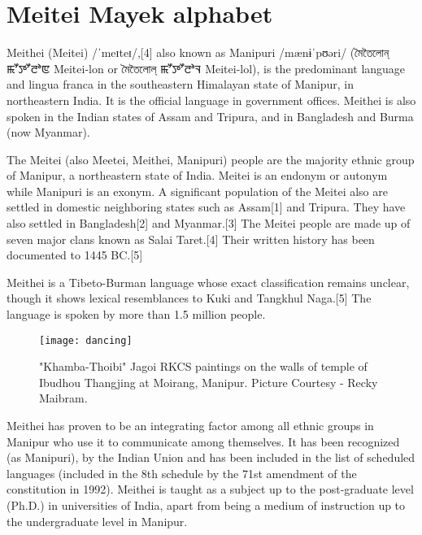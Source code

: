 \section{Meitei Mayek alphabet}
\label{s:meiteimayek}
\newfontfamily{}

\def\textmeitei#1{{\meitei #1}\xspace}

Meithei (Meitei) /ˈmeɪteɪ/,[4] also known as Manipuri /mænɨˈpʊəri/ ({\pan মৈতৈলোন্} \textmeitei{ꯃꯧꯇꯧꯂꯣꯟ} Meitei-lon or {\pan মৈতৈলোল্} \textmeitei{ꯃꯧꯇꯧꯂꯣꯜ} Meitei-lol), is the predominant language and lingua franca in the southeastern Himalayan state of Manipur, in northeastern India. It is the official language in government offices. Meithei is also spoken in the Indian states of Assam and Tripura, and in Bangladesh and Burma (now Myanmar).

The Meitei (also Meetei, Meithei, Manipuri) people are the majority ethnic group of Manipur, a northeastern state of India. Meitei is an endonym or autonym while Manipuri is an exonym. A significant population of the Meitei also are settled in domestic neighboring states such as Assam[1] and Tripura. They have also settled in Bangladesh[2] and Myanmar.[3]
The Meitei people are made up of seven major clans known as Salai Taret.[4] Their written history has been documented to 1445 BC.[5]

Meithei is a Tibeto-Burman language whose exact classification remains unclear, though it shows lexical resemblances to Kuki and Tangkhul Naga.[5] The language is spoken by more than 1.5 million people.

\begin{figure}[htbp]
\centering
\texttt{[image: dancing]}

\caption{"Khamba-Thoibi" Jagoi 
RKCS paintings on the walls of temple of Ibudhou Thangjing at Moirang, Manipur. 
Picture Courtesy - Recky Maibram.}
\end{figure}

Meithei has proven to be an integrating factor among all ethnic groups in Manipur who use it to communicate among themselves. It has been recognized (as Manipuri), by the Indian Union and has been included in the list of scheduled languages (included in the 8th schedule by the 71st amendment of the constitution in 1992). Meithei is taught as a subject up to the post-graduate level (Ph.D.) in universities of India, apart from being a medium of instruction up to the undergraduate level in Manipur.

